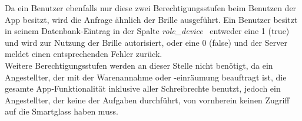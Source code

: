 Da ein Benutzer ebenfalls nur diese zwei Berechtigungsstufen beim Benutzen der App besitzt, wird die Anfrage ähnlich der Brille ausgeführt. Ein Benutzer besitzt in seinem Datenbank-Eintrag in der Spalte \emph{role\_device}~ entweder eine 1 (true) und wird zur Nutzung der Brille autorisiert, oder eine 0 (false) und der Server meldet einen entsprechenden Fehler zurück.\\

Weitere Berechtigungsstufen werden an dieser Stelle nicht benötigt, da ein Angestellter, der mit der Warenannahme oder -einräumung beauftragt ist, die gesamte App-Funktionalität inklusive aller Schreibrechte benutzt, jedoch ein Angestellter, der keine der Aufgaben durchführt, von vornherein keinen Zugriff auf die Smartglass haben muss.

